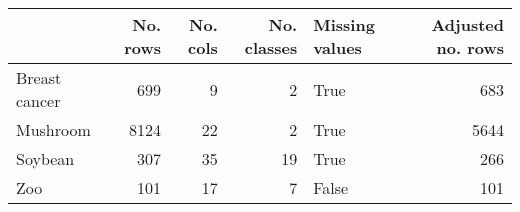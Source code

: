 \begin{tabular}{lrrrlr}
\toprule
{} &  No. rows &  No. cols &  No. classes &  Missing values &  Adjusted no. rows \\
\midrule
Breast cancer &       699 &         9 &            2 &            True &                683 \\
Mushroom      &      8124 &        22 &            2 &            True &               5644 \\
Soybean       &       307 &        35 &           19 &            True &                266 \\
Zoo           &       101 &        17 &            7 &           False &                101 \\
\bottomrule
\end{tabular}
